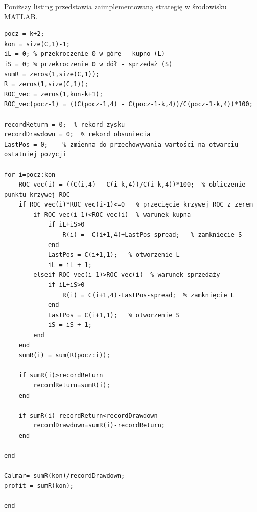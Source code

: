 \noindent Poniższy listing przedstawia zaimplementowaną strategię w środowisku MATLAB.
\begin{scriptsize}
\begin{lstlisting}
pocz = k+2;	
kon = size(C,1)-1;
iL = 0; % przekroczenie 0 w górę - kupno (L)
iS = 0; % przekroczenie 0 w dół - sprzedaż (S)
sumR = zeros(1,size(C,1));
R = zeros(1,size(C,1));
ROC_vec = zeros(1,kon-k+1);
ROC_vec(pocz-1) = ((C(pocz-1,4) - C(pocz-1-k,4))/C(pocz-1-k,4))*100;

recordReturn = 0;  % rekord zysku
recordDrawdown = 0;  % rekord obsuniecia
LastPos = 0;    % zmienna do przechowywania wartości na otwarciu ostatniej pozycji

for i=pocz:kon
    ROC_vec(i) = ((C(i,4) - C(i-k,4))/C(i-k,4))*100;  % obliczenie punktu krzywej ROC
    if ROC_vec(i)*ROC_vec(i-1)<=0   % przecięcie krzywej ROC z zerem
        if ROC_vec(i-1)<ROC_vec(i)  % warunek kupna
            if iL+iS>0
                R(i) = -C(i+1,4)+LastPos-spread;   % zamknięcie S
            end
            LastPos = C(i+1,1);   % otworzenie L
            iL = iL + 1;
        elseif ROC_vec(i-1)>ROC_vec(i)  % warunek sprzedaży
            if iL+iS>0
                R(i) = C(i+1,4)-LastPos-spread;  % zamknięcie L
            end
            LastPos = C(i+1,1);   % otworzenie S
            iS = iS + 1;
        end
    end
    sumR(i) = sum(R(pocz:i));
  
    if sumR(i)>recordReturn
        recordReturn=sumR(i);
    end
    
    if sumR(i)-recordReturn<recordDrawdown
        recordDrawdown=sumR(i)-recordReturn;  
    end

end

Calmar=-sumR(kon)/recordDrawdown;
profit = sumR(kon);

end
\end{lstlisting}
\end{scriptsize}



